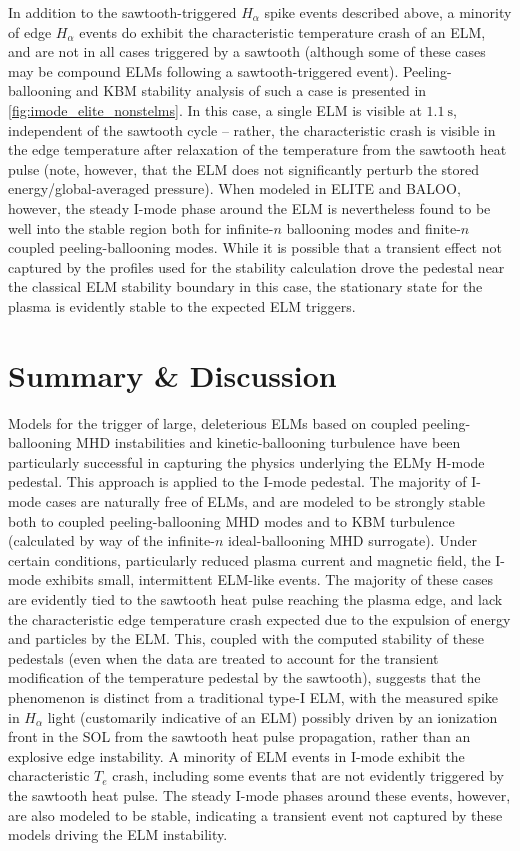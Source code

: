 In addition to the sawtooth-triggered $H_\alpha$ spike events described above, a minority of edge $H_\alpha$ events do exhibit the characteristic temperature crash of an ELM, and are not in all cases triggered by a sawtooth (although some of these cases may be compound ELMs following a sawtooth-triggered event).  Peeling-ballooning and KBM stability analysis of such a case is presented in \cref{fig:imode_elite_nonstelms}.  In this case, a single ELM is visible at $\SI{1.1}{\second}$, independent of the sawtooth cycle -- rather, the characteristic crash is visible in the edge temperature after relaxation of the temperature from the sawtooth heat pulse (note, however, that the ELM does not significantly perturb the stored energy/global-averaged pressure).  When modeled in ELITE and BALOO, however, the steady I-mode phase around the ELM is nevertheless found to be well into the stable region both for infinite-$n$ ballooning modes and finite-$n$ coupled peeling-ballooning modes.  While it is possible that a transient effect not captured by the profiles used for the stability calculation drove the pedestal near the classical ELM stability boundary in this case, the stationary state for the plasma is evidently stable to the expected ELM triggers.\nicesectionending

\section{Summary \& Discussion}\label{sec:imode_mod_conclusions}

Models for the trigger of large, deleterious ELMs based on coupled peeling-ballooning MHD instabilities \cite{Wilson2002,Snyder2003,Snyder2004,Wilson2006} and kinetic-ballooning turbulence \cite{Snyder1999,Candy2005,Snyder2001} have been particularly successful in capturing the physics underlying the ELMy H-mode pedestal.  This approach is applied to the I-mode pedestal.  The majority of I-mode cases are naturally free of ELMs, and are modeled to be strongly stable both to coupled peeling-ballooning MHD modes and to KBM turbulence (calculated by way of the infinite-$n$ ideal-ballooning MHD surrogate).  Under certain conditions, particularly reduced plasma current and magnetic field, the I-mode exhibits small, intermittent ELM-like events.  The majority of these cases are evidently tied to the sawtooth heat pulse reaching the plasma edge, and lack the characteristic edge temperature crash expected due to the expulsion of energy and particles by the ELM.  This, coupled with the computed stability of these pedestals (even when the data are treated to account for the transient modification of the temperature pedestal by the sawtooth), suggests that the phenomenon is distinct from a traditional type-I ELM, with the measured spike in $H_\alpha$ light (customarily indicative of an ELM) possibly driven by an ionization front in the SOL from the sawtooth heat pulse propagation, rather than an explosive edge instability.  A minority of ELM events in I-mode exhibit the characteristic $T_e$ crash, including some events that are not evidently triggered by the sawtooth heat pulse.  The steady I-mode phases around these events, however, are also modeled to be stable, indicating a transient event not captured by these models driving the ELM instability.

